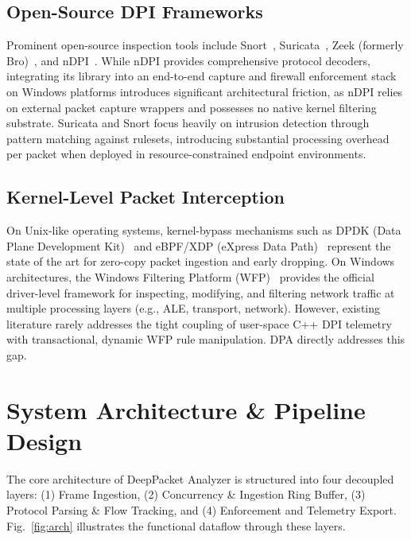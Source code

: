 \documentclass[conference]{IEEEtran}
\begin{document}
\subsection{Open-Source DPI Frameworks}
Prominent open-source inspection tools include Snort~\cite{roesch1999snort}, Suricata~\cite{alvarez2014suricata}, Zeek (formerly Bro)~\cite{paxson1999bro}, and nDPI~\cite{deri2014ndpi}. While nDPI provides comprehensive protocol decoders, integrating its library into an end-to-end capture and firewall enforcement stack on Windows platforms introduces significant architectural friction, as nDPI relies on external packet capture wrappers and possesses no native kernel filtering substrate. Suricata and Snort focus heavily on intrusion detection through pattern matching against rulesets, introducing substantial processing overhead per packet when deployed in resource-constrained endpoint environments.

\subsection{Kernel-Level Packet Interception}
On Unix-like operating systems, kernel-bypass mechanisms such as DPDK (Data Plane Development Kit)~\cite{dpdk2024} and eBPF/XDP (eXpress Data Path)~\cite{vieira2020fast} represent the state of the art for zero-copy packet ingestion and early dropping. On Windows architectures, the Windows Filtering Platform (WFP)~\cite{msdnwfp2024} provides the official driver-level framework for inspecting, modifying, and filtering network traffic at multiple processing layers (e.g., ALE, transport, network). However, existing literature rarely addresses the tight coupling of user-space C++ DPI telemetry with transactional, dynamic WFP rule manipulation. DPA directly addresses this gap.

\section{System Architecture \& Pipeline Design}
\label{sec:architecture}
The core architecture of DeepPacket Analyzer is structured into four decoupled layers: (1) Frame Ingestion, (2) Concurrency \& Ingestion Ring Buffer, (3) Protocol Parsing \& Flow Tracking, and (4) Enforcement and Telemetry Export. Fig.~\ref{fig:arch} illustrates the functional dataflow through these layers.
\end{document}
